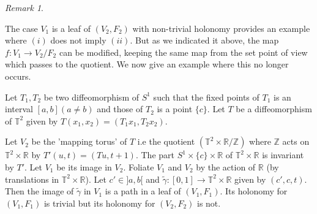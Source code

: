 \documentclass[12pt]{amsart}
\theoremstyle{definition}
\theoremstyle{remark}
\newtheorem{rem}[thm]{Remark}
\numberwithin{equation}{section}
\newcommand{\Z}{{\mathbb{Z}}}
\newcommand{\R}{{\mathbb{R}}}
\begin{document}
\begin{rem}
\begin{enumerate}
     \end{enumerate}

\end{rem}
The case $V_1$ is a leaf of $(V_2, F_2)$ with non-trivial holonomy provides an example where $(i)$ does not imply $(ii)$. But as we indicated it above, the map $f: V_1\to V_2/F_2$ can be modified, keeping the same map from the set point of view which passes to the quotient. We now give an example where this no longer occurs.
 
Let $T_1, T_2$ be two diffeomorphism of $S^1$ such that the fixed points of $T_1$ is an interval $[a, b] (a\not= b)$ and those of $T_2$ is a point $\{c\}$. Let $T$ be a diffeomorphism of $\mathbb{T}^2$ given by $T(x_1, x_2) = (T_1x_1, T_2x_2)$. 

Let $V_2$ be the 'mapping torus' of $T$ i.e the quotient $(\mathbb{T}^2\times \R/\Z)$ where $\Z$ acts on $\mathbb{T}^2\times \R$ by $T'(u, t) = (Tu, t+1)$. The part $S^1 \times \{c\} \times \R$ of $\mathbb{T}^2\times \R$ is invariant by $T'$. Let $V_1$ be its image in $V_2$. Foliate $V_1$ and $V_2$ by the action of $\R$ (by translations in $\mathbb{T}^2 \times \R$). Let $c' \in ]a,b[$ and $\tilde{\gamma}: [0,1] \to \mathbb{T}^2 \times \R$ given by $(c', c, t)$. Then the image of $\tilde{\gamma}$ in $V_1$ is a path in a leaf of $(V_1, F_1)$. Its holonomy for $(V_1, F_1)$ is trivial but its holonomy for $(V_2, F_2)$ is not.
\end{document}
